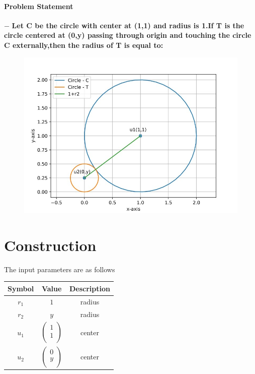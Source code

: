 \documentclass[10pt, a4paper]{article}
\title{\mytitle}
\author{\myauthor\hspace{1em}\\\contact\\FWC22094\hspace{6.5em}IITH\hspace{0.5em}\mymodule\hspace{6em}MATRICES}
\date{}
\begin{document}
 \maketitle
 \paragraph*{\large Problem Statement}
$-$ \textbf{ Let C be the circle with center at (1,1) and radius is 1.If T is the circle centered at (0,y) passing through origin and touching the circle C externally,then the radius of T is equal to:}
 
\begin{figure}[h]
\centering
\includegraphics[width=1\columnwidth]{circle.jpeg}
\end{figure}
 \section*{Construction}
\vspace{2mm}
 The input parameters are as follows
{
\setlength\extrarowheight{4pt}
\begin{center}
 \begin{tabular}{|c|c|c|}
 \hline
 \textbf{Symbol}&\textbf{Value}&\textbf{Description}\\
 \hline
 $r_1$&$
 1$
 &radius  \\
 \hline
 $r_2$&$
 y$
 &radius\\
 \hline
 
 $u_1$&$
 \begin{pmatrix}
  1\\
  1\\
 \end{pmatrix}$
 &center\\
 \hline
 $u_2$&$
 \begin{pmatrix}
  0\\
  y\\
 \end{pmatrix}$
 &center\\
 \hline
 
 \end{tabular}
 \end{center}
}
\end{document}
